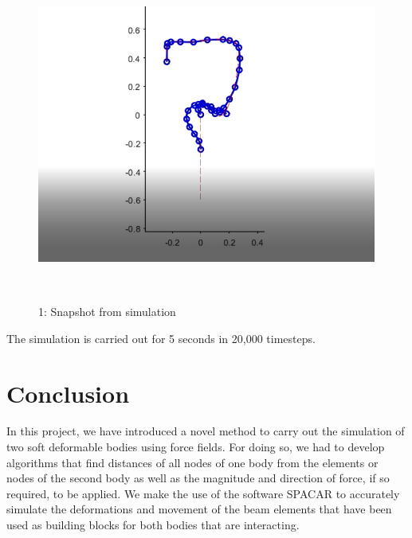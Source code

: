 \documentclass[12pt]{report}
\begin{document}


\vspace{\baselineskip}



\begin{figure}[H]
	\begin{Center}
		\includegraphics[width=4.4in,height=4.36in]{./media/image12.png}
		\caption{1: Snapshot from simulation}
		\label{fig:1_Snapshot_from_simulation}
	\end{Center}
\end{figure}



\par

\par

\begin{FlushLeft}
The simulation is carried out for 5 seconds in 20,000 timesteps.


\newpage

\end{FlushLeft}\par

\section*{Conclusion}
In this project, we have introduced a novel method to carry out the simulation of two soft deformable bodies using force fields. For doing so, we had to develop algorithms that find distances of all nodes of one body from the elements or nodes of the second body as well as the magnitude and direction of force, if so required, to be applied. We make the use of the software SPACAR to accurately simulate the deformations and movement of the beam elements that have been used as building blocks for both bodies that are interacting.\par
\end{document}
